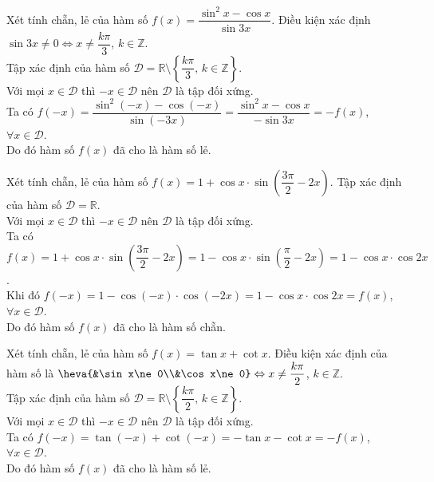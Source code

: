 \begin{bt}%
	Xét tính chẵn, lẻ của hàm số $f(x)=\dfrac{\sin^2 x-\cos x}{\sin 3x}$.
	\loigiai
	{
		Điều kiện xác định $\sin 3x\ne0\Leftrightarrow x\ne\dfrac{k\pi}{3}$, $k\in\mathbb{Z}$.\\
		Tập xác định của hàm số $\mathscr{D}=\mathbb{R}\setminus\left\{\dfrac{k\pi}{3},\,k\in\mathbb{Z}\right\}$.\\
		Với mọi $x\in\mathscr{D}$ thì $-x\in\mathscr{D}$ nên $\mathscr{D}$ là tập đối xứng.\\
		Ta có $f(-x)=\dfrac{\sin^2(-x)-\cos(-x)}{\sin(-3x)}=\dfrac{\sin^2 x-\cos x}{-\sin 3x}=-f(x)$, $\forall x\in\mathscr{D}$.\\
		Do đó hàm số $f(x)$ đã cho là hàm số lẻ.
	}
\end{bt}
\begin{bt}%
	Xét tính chẵn, lẻ của hàm số $f(x)=1+\cos x\cdot\sin\left(\dfrac{3\pi}{2}-2x\right)$.
	\loigiai
	{
		Tập xác định của hàm số $\mathscr{D}=\mathbb{R}$.\\
		Với mọi $x\in\mathscr{D}$ thì $-x\in\mathscr{D}$ nên $\mathscr{D}$ là tập đối xứng.\\
		Ta có $f(x)=1+\cos x\cdot\sin\left(\dfrac{3\pi}{2}-2x\right)=1-\cos x\cdot\sin\left(\dfrac{\pi}{2}-2x\right)=1-\cos x\cdot\cos 2x$.\\
		Khi đó $f(-x)=1-\cos(-x)\cdot\cos(-2x)=1-\cos x\cdot\cos 2x=f(x)$, $\forall x\in\mathscr{D}$.\\
		Do đó hàm số $f(x)$ đã cho là hàm số chẵn.
	}
\end{bt}
\begin{bt}%
	Xét tính chẵn, lẻ của hàm số $f(x)=\tan x+\cot x$.
	\loigiai
	{
		Điều kiện xác định của hàm số là $\heva{&\sin x\ne0\\&\cos x\ne0}\Leftrightarrow x\ne\dfrac{k\pi}{2}$, $k\in\mathbb{Z}$.\\
		Tập xác định của hàm số $\mathscr{D}=\mathbb{R}\setminus\left\{\dfrac{k\pi}{2},\,k\in\mathbb{Z}\right\}$.\\
		Với mọi $x\in\mathscr{D}$ thì $-x\in\mathscr{D}$ nên $\mathscr{D}$ là tập đối xứng.\\
		Ta có $f(-x)=\tan(-x)+\cot(-x)=-\tan x-\cot x=-f(x)$, $\forall x\in\mathscr{D}$.\\
		Do đó hàm số $f(x)$ đã cho là hàm số lẻ.
	}
\end{bt}
